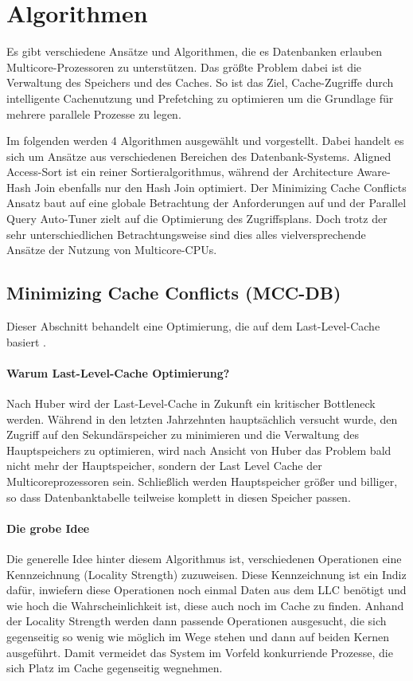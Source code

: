 \chapter{Algorithmen}
\label{sec:Algorithmen}

Es gibt verschiedene Ansätze und Algorithmen, die es Datenbanken erlauben Multicore-Prozessoren zu unterstützen. Das größte Problem dabei ist die Verwaltung des Speichers und des Caches. So ist das Ziel, Cache-Zugriffe durch intelligente Cachenutzung und Prefetching zu optimieren um die Grundlage für mehrere parallele Prozesse zu legen.

Im folgenden werden 4 Algorithmen ausgewählt und vorgestellt. Dabei handelt es sich um Ansätze aus verschiedenen Bereichen des Datenbank-Systems. Aligned Access-Sort ist ein reiner Sortieralgorithmus, während der Architecture Aware-Hash Join ebenfalls nur den Hash Join optimiert. Der Minimizing Cache Conflicts Ansatz baut auf eine globale Betrachtung der Anforderungen auf und der Parallel Query Auto-Tuner zielt auf die Optimierung des Zugriffsplans. Doch trotz der sehr unterschiedlichen Betrachtungsweise sind dies alles vielversprechende Ansätze der Nutzung von Multicore-CPUs.


\section{Minimizing Cache Conflicts (MCC-DB)}
\label{sec:MCC-DB}
Dieser Abschnitt behandelt eine Optimierung, die auf dem Last-Level-Cache basiert \cite{LEE}. 

\subsubsection*{Warum Last-Level-Cache Optimierung?}
Nach Huber \cite{HUBER} wird der Last-Level-Cache in Zukunft ein kritischer Bottleneck werden. Während in den letzten Jahrzehnten hauptsächlich versucht wurde, den Zugriff auf den Sekundärspeicher zu minimieren und die Verwaltung des Hauptspeichers zu optimieren, wird nach Ansicht von Huber das Problem bald nicht mehr der Hauptspeicher, sondern der Last Level Cache der Multicoreprozessoren sein. Schließlich werden Hauptspeicher größer und billiger, so dass Datenbanktabelle teilweise komplett in diesen Speicher passen.

\subsubsection*{Die grobe Idee}
Die generelle Idee hinter diesem Algorithmus ist, verschiedenen Operationen eine Kennzeichnung (Locality Strength) zuzuweisen. Diese Kennzeichnung ist ein Indiz dafür, inwiefern diese Operationen noch einmal Daten aus dem LLC benötigt und wie hoch die Wahrscheinlichkeit ist, diese auch noch im Cache zu finden. Anhand der Locality Strength werden dann passende Operationen ausgesucht, die sich gegenseitig so wenig wie möglich im Wege stehen und dann auf beiden Kernen ausgeführt. Damit vermeidet das System im Vorfeld konkurriende Prozesse, die sich Platz im Cache gegenseitig wegnehmen.

